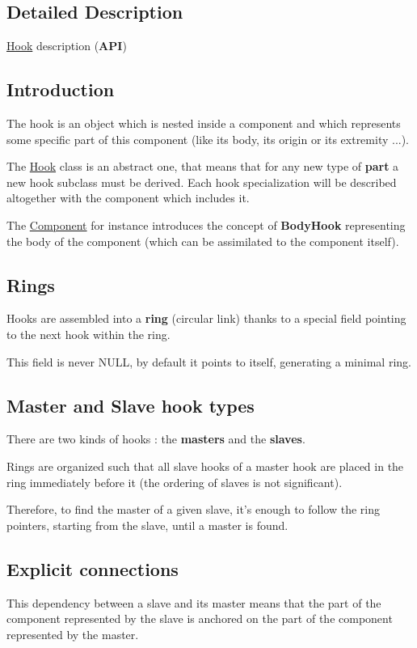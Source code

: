 \subsection{Detailed Description}
\hyperlink{classHurricane_1_1Hook}{Hook} description ({\bfseries A\-P\-I}) 

\hypertarget{classHurricane_1_1Hook_secHookIntro}{}\subsection{Introduction}\label{classHurricane_1_1Hook_secHookIntro}
The hook is an object which is nested inside a component and which represents some specific part of this component (like its body, its origin or its extremity ...).

The \hyperlink{classHurricane_1_1Hook}{Hook} class is an abstract one, that means that for any new type of {\bfseries part} a new hook subclass must be derived. Each hook specialization will be described altogether with the component which includes it.

The \hyperlink{classHurricane_1_1Component}{Component} for instance introduces the concept of {\bfseries Body\-Hook} representing the body of the component (which can be assimilated to the component itself).\hypertarget{classHurricane_1_1Hook_secHookRings}{}\subsection{Rings}\label{classHurricane_1_1Hook_secHookRings}
Hooks are assembled into a {\bfseries ring} (circular link) thanks to a special field pointing to the next hook within the ring.

This field is never N\-U\-L\-L, by default it points to itself, generating a minimal ring.\hypertarget{classHurricane_1_1Hook_secHookMasterAndSlaveHookTypes}{}\subsection{Master and Slave hook types}\label{classHurricane_1_1Hook_secHookMasterAndSlaveHookTypes}
There are two kinds of hooks \-: the {\bfseries masters} and the {\bfseries slaves}.

Rings are organized such that all slave hooks of a master hook are placed in the ring immediately before it (the ordering of slaves is not significant).

Therefore, to find the master of a given slave, it's enough to follow the ring pointers, starting from the slave, until a master is found.\hypertarget{classHurricane_1_1Hook_secHookExplicitConnections}{}\subsection{Explicit connections}\label{classHurricane_1_1Hook_secHookExplicitConnections}
This dependency between a slave and its master means that the part of the component represented by the slave is anchored on the part of the component represented by the master.


